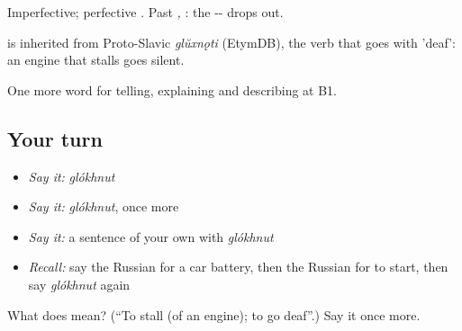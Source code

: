 Imperfective; perfective \emph{}. Past \emph{, }: the -- drops out.

\begin{cousinweb}
\emph{} is inherited from Proto-Slavic \emph{glŭxnǫti} (EtymDB), the verb that goes with \emph{} 'deaf': an engine that stalls goes silent.
\end{cousinweb}

\begin{grammarlens}[title={What you've built}]
One more word for telling, explaining and describing at B1.
\end{grammarlens}

\subsection*{Your turn}
\begin{itemize}
\raggedright
  \item \emph{Say it:} \emph{glókhnut}
  \item \emph{Say it:} \emph{glókhnut}, once more
  \item \emph{Say it:} a sentence of your own with \emph{glókhnut}
  \item \emph{Recall:} say the Russian for a car battery, then the Russian for to start, then say \emph{glókhnut} again
\end{itemize}

\begin{tcolorbox}[breakable,colback=teal!4,colframe=teal!35!black,title={Before you move on}]
What does  mean? (\textquotedblleft{}To stall (of an engine); to go deaf\textquotedblright{}.) Say it once more.
\end{tcolorbox}

